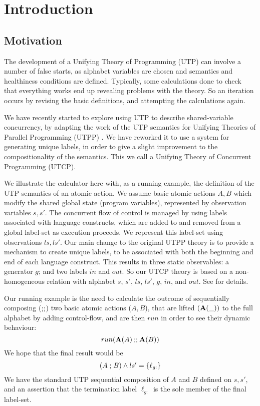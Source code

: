 \section{Introduction}\label{sec:Intro}

\subsection{Motivation}

The development of a Unifying Theory of Programming (UTP)
can involve a number of false starts,
as alphabet variables are chosen
and semantics and healthiness conditions are defined.
Typically, some calculations done to check that everything
works end up revealing problems with the theory.
So an iteration occurs by revising the basic definitions,
and attempting the calculations again.

We have recently started to explore using UTP
to describe shared-variable concurrency,
by adapting the work of the  UTP semantics for Unifying Theories
of Parallel Programming (UTPP) \cite{DBLP:conf/icfem/WoodcockH02}.
We have reworked it to use a system for generating unique labels,
in order to give a slight improvement to the compositionality
of the semantics.
This we call a Unifying Theory of Concurrent Programming (UTCP)\cite{conf/tase/BMN16}.

We illustrate the calculator here
with, as a running example,
the definition of the UTP semantics of an atomic action.
We assume basic atomic actions $A,B$ which modify the
shared global state (program variables),
represented by observation variables $s,s'$.
The concurrent flow of control is managed by using labels
associated with language constructs, which are added to and removed
from a global label-set as execution proceeds.
We represent this label-set using observations $ls,ls'$.
Our main change to the original UTPP theory
is to provide a mechanism to create unique labels,
to be associated with both the beginning and end of each language
construct. This results in three static observables:
a generator $g$;
and two labels $in$ and $out$.
So our UTCP theory is based on a non-homogeneous relation
with alphabet $s$, $s'$, $ls$, $ls'$, $g$, $in$, and $out$.
See \cite{conf/tase/BMN16} for details.

Our running example is the need to calculate the outcome
of sequentially composing ($\mathbin{\mathbf{;\!;}}$)
two basic atomic actions ($A,B$),
that are lifted $(\mathbf{A}(\_))$ to the full alphabet by adding control-flow,
and are then $run$ in order to see their dynamic behaviour:
\[
  run(\mathbf{A}(A) \mathbin{\mathbf{;\!;}} \mathbf{A}(B))
\]
We hope that the final result would be
\[
  (A \mathrel{;} B) \land ls' = \{{\ell_{g:}}\}
\]
We have the standard UTP sequential composition of $A$ and $B$ defined on $s,s'$,
and an assertion that the termination label $\ell_{g:}$
is the sole member of the final label-set.

